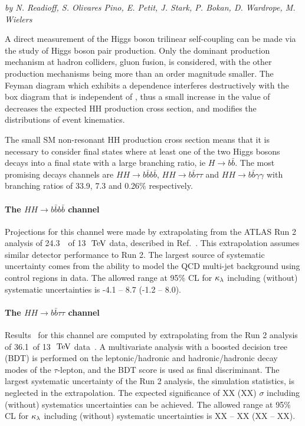 \begin{center}
\textit{by N. Readioff, S. Olivares Pino, E. Petit, J. Stark, P. Bokan, D. Wardrope, M. Wielers}
\end{center}

A direct measurement of the Higgs boson trilinear self-coupling \lHHH can be made via the study of Higgs boson pair production. Only the dominant production mechanism at hadron colliders, gluon fusion, is considered, with the other production mechanisms being more than an order magnitude smaller.
The Feyman diagram which exhibits a \lHHH dependence interferes destructively with the box diagram that is independent of \lHHH , thus a small increase in the value of \lHHH decreases the expected HH production cross section, and modifies the distributions of event kinematics.

The small SM non-resonant HH production cross section means that it is necessary to consider final states where at least one of the two Higgs bosons decays into a final state with a large branching ratio, ie $H \rightarrow b\bar{b}$. The most promising decays channels are $HH \rightarrow b\bar{b}b\bar{b}$, $HH \rightarrow b\bar{b}\tau\tau$ and $HH \rightarrow b\bar{b}\gamma\gamma$ with branching ratios of 33.9, 7.3 and 0.26\% respectively.

%
\paragraph{The $HH \rightarrow b\bar{b}b\bar{b}$ channel}

Projections for this channel were made by extrapolating from the ATLAS Run 2 analysis of 24.3~\ifb\ of 13~$\,\mathrm{TeV}$ data, described in Ref.~\cite{ITKPixelTDR}. This extrapolation assumes similar detector performance to Run 2. The largest source of systematic uncertainty comes from the ability to model the QCD multi-jet background using control regions in data. The allowed range at 95\% CL for $\kappa_{\lambda}$ including (without) systematic uncertainties is -4.1 -- 8.7 (-1.2 -- 8.0).

%
\paragraph{The $HH \rightarrow b\bar{b}\tau\tau$ channel}

Results~\cite{ATLASHHPUBnote} for this channel are computed by extrapolating from the Run 2 analysis of 36.1~\ifb of 13~$\,\mathrm{TeV}$ data~\cite{ATLASrun2HHbbtautau}. A multivariate analysis with a boosted decision tree (BDT) is performed on the leptonic/hadronic and hadronic/hadronic decay modes of the $\tau$-lepton, and the BDT score is used as final discriminant. The largest systematic uncertainty of the Run 2 analysis, the simulation statistics, is neglected in the extrapolation. The expected significance of XX (XX) $\sigma$ including (without) systematics uncertainties can be achieved. The allowed range at 95\% CL for $\kappa_{\lambda}$ including (without) systematic uncertainties is XX -- XX (XX -- XX).


